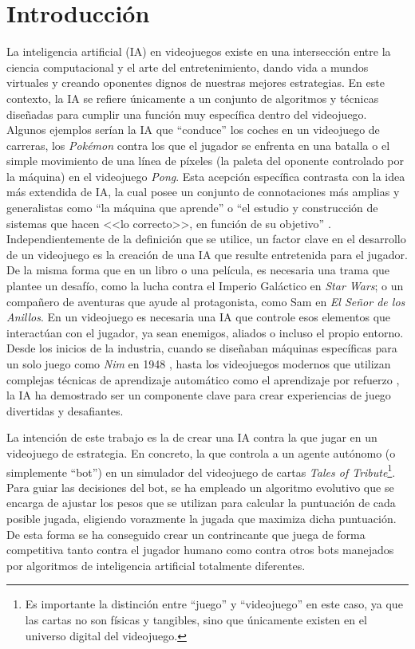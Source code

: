 \chapter{Introducción} \label{chap:introduccion}

La inteligencia artificial (IA) en videojuegos existe en una intersección entre la ciencia computacional y el arte del entretenimiento, dando vida a mundos virtuales y creando oponentes dignos de nuestras mejores estrategias. En este contexto, la IA se refiere únicamente a un conjunto de algoritmos y técnicas diseñadas para cumplir una función muy específica dentro del videojuego. Algunos ejemplos serían la IA que ``conduce'' los coches en un videojuego de carreras, los \textit{Pokémon} contra los que el jugador se enfrenta en una batalla o el simple movimiento de una línea de píxeles (la paleta del oponente controlado por la máquina) en el videojuego \textit{Pong}. Esta acepción específica contrasta con la idea más extendida de IA, la cual posee un conjunto de connotaciones más amplias y generalistas como ``la máquina que aprende'' o ``el estudio y construcción de sistemas que hacen <<lo correcto>>, en función de su objetivo'' \cite{russell_artificial_2020}. Independientemente de la definición que se utilice, un factor clave en el desarrollo de un videojuego es la creación de una IA que resulte entretenida para el jugador. De la misma forma que en un libro o una película, es necesaria una trama que plantee un desafío, como la lucha contra el Imperio Galáctico en \textit{Star Wars}; o un compañero de aventuras que ayude al protagonista, como Sam en \textit{El Señor de los Anillos}. En un videojuego es necesaria una IA que controle esos elementos que interactúan con el jugador, ya sean enemigos, aliados o incluso el propio entorno. Desde los inicios de la industria, cuando se diseñaban máquinas específicas para un solo juego como \textit{Nim} en 1948 \cite{redheffer_machine_1948}, hasta los videojuegos modernos que utilizan complejas técnicas de aprendizaje automático como el aprendizaje por refuerzo \cite{gaudreau_game_2025}, la IA ha demostrado ser un componente clave para crear experiencias de juego divertidas y desafiantes.

La intención de este trabajo es la de crear una IA contra la que jugar en un videojuego de estrategia. En concreto, la que controla a un agente autónomo (o simplemente ``bot'') en un simulador del videojuego de cartas \textit{Tales of Tribute}\footnote{Es importante la distinción entre ``juego'' y ``videojuego'' en este caso, ya que las cartas no son físicas y tangibles, sino que únicamente existen en el universo digital del videojuego.}. Para guiar las decisiones del bot, se ha empleado un algoritmo evolutivo que se encarga de ajustar los pesos que se utilizan para calcular la puntuación de cada posible jugada, eligiendo vorazmente la jugada que maximiza dicha puntuación. De esta forma se ha conseguido crear un contrincante que juega de forma competitiva tanto contra el jugador humano como contra otros bots manejados por algoritmos de inteligencia artificial totalmente diferentes.